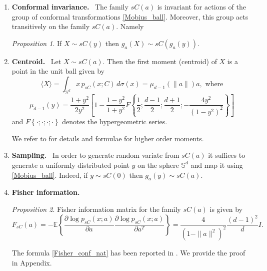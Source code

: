 \documentclass{article}
\theoremstyle{plain}%
\theoremstyle{definition}
\theoremstyle{remark}
\theoremstyle{prop}
\newtheorem{prop}{Proposition}
\begin{document}
\begin{enumerate}

\item [i)] {\bf Conformal invariance.} \,
 The family $sC(a)$ is invariant for actions of the group of conformal transformations \eqref{Mobius_ball}. Moreover, this group acts transitively on the family $sC(a)$. Namely


\begin{prop}
If $X \sim sC(y)$ then $g_a(X) \sim sC(g_a(y))$.
\end{prop}


\item [ii)] {\bf Centroid.} \, Let $X \sim sC(a)$. Then the first moment (centroid) of $X$ is a point in the unit ball given by
$$
\langle X \rangle = \int_{{\mathbb S}^d} x \, p_{sC}(x;C) \, d \sigma(x) = \mu_{d-1}(\| a \|) a, \mbox{  where}
$$
$$\mu_{d-1}(y) = \frac{1+y^2}{2 y^2} \left[ 1 - \frac{1-y^2}{1+y^2} F \left\{\frac{1}{2};\frac{d-1}{2};\frac{d+1}{2};-\frac{4 y^2}{(1-y^2)^2} \right\} \right]
$$
and $F\left\{ \cdot;\cdot;\cdot;\cdot\right\}$ denotes the hypergeometric series.

We refer to \cite{KMcC} for details and formulae for higher order moments.


\item [iii)] {\bf Sampling.} \, In order to generate random variate from $sC(a)$ it suffices to generate a uniformly distributed point $y$ on the sphere ${\mathbb S}^d$ and map it using \eqref{Mobius_ball}. Indeed, if $y \sim sC(0)$ then $g_a(y) \sim sC(a)$.

\item[iv)] {\bf Fisher information.} 

\begin{prop}
\label{Fisher_info_Cauchy}
Fisher information matrix for the family $sC(a)$ is given by
\begin{equation}
\label{Fisher_conf_nat}
F_{sC}(a) = - {\mathbb E} \left \{ \frac{\partial \log p_{sC}(x;a)}{\partial a} \frac{\partial \log p_{sC}(x;a)}{\partial a^T} \right \} = \frac{4}{(1 - \| a \|^2)^2} \frac{(d-1)^2}{d} I.
\end{equation}
\end{prop}
The formula \eqref{Fisher_conf_nat} has been reported in \cite{KMcC}. We provide the proof in Appendix.


\end{enumerate}
\end{document}
